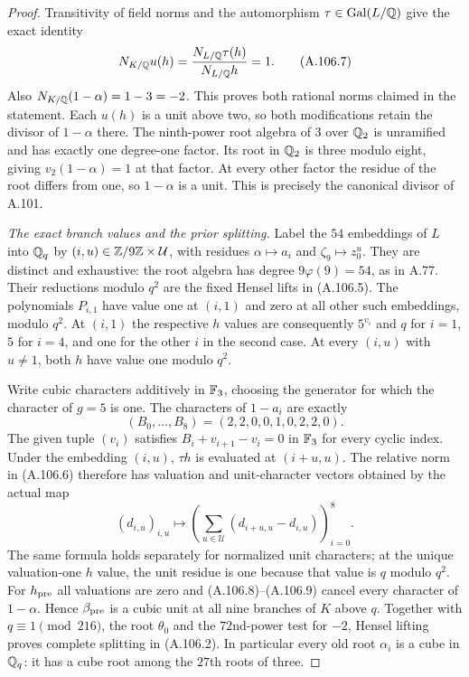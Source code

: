 \begin{proof}
Transitivity of field norms and the automorphism
$\tau\in\operatorname{Gal}(L/\mathbb Q)$ give the exact identity
\[
 N_{K/\mathbb Q}u(h)
      =\frac{N_{L/\mathbb Q}\tau(h)}{N_{L/\mathbb Q}h}=1.
 \tag{A.106.7}
\]
Also $N_{K/\mathbb Q}(1-\alpha)=1-3=-2$.
This proves both rational norms claimed in the statement.
Each $u(h)$ is a unit above two, so both modifications
retain the divisor of $1-\alpha$ there.
The ninth-power root algebra of $3$ over $\mathbb Q_2$ is
unramified and has exactly one degree-one factor.
Its root in $\mathbb Q_2$ is three modulo eight, giving
$v_2(1-\alpha)=1$ at that factor.
At every other factor the residue of the root differs
from one, so $1-\alpha$ is a unit.
This is precisely the canonical divisor of A.101.

\emph{The exact branch values and the prior splitting.}
Label the $54$ embeddings of $L$ into $\mathbb Q_q$ by
$(i,u)\in\mathbb Z/9\mathbb Z\times\mathcal U$, with residues
$\alpha\mapsto a_i$ and $\zeta_9\mapsto z_0^u$.
They are distinct and exhaustive: the root algebra has
degree $9\varphi(9)=54$, as in A.77.
Their reductions modulo $q^2$ are the fixed Hensel
lifts in (A.106.5).
The polynomials $P_{i,1}$ have value one at $(i,1)$
and zero at all other such embeddings, modulo $q^2$.
At $(i,1)$ the respective $h$ values are consequently
$5^{v_i}$ and $q$ for $i=1$, $5$ for $i=4$, and one
for the other $i$ in the second case.
At every $(i,u)$ with $u\ne1$, both $h$ have value one
modulo $q^2$.

Write cubic characters additively in $\mathbb F_3$, choosing
the generator for which the character of $g=5$ is one.
The characters of $1-a_i$ are exactly
\[
       (B_0,\ldots,B_8)=(2,2,0,0,1,0,2,2,0).
 \tag{A.106.8}
\]
The given tuple $(v_i)$ satisfies
$B_i+v_{i+1}-v_i=0$ in $\mathbb F_3$ for every cyclic index.
Under the embedding $(i,u)$, $\tau h$ is evaluated
at $(i+u,u)$.
The relative norm in (A.106.6) therefore has valuation
and unit-character vectors obtained by the actual map
\[
 (d_{i,u})_{i,u}\longmapsto
          \left(\sum_{u\in\mathcal U}
                      (d_{i+u,u}-d_{i,u})\right)_{i=0}^8.
 \tag{A.106.9}
\]
The same formula holds separately for normalized unit
characters; at the unique valuation-one $h$ value,
the unit residue is one because that value is $q$
modulo $q^2$.
For $h_{\rm pre}$ all valuations are zero and
(A.106.8)--(A.106.9) cancel every character of
$1-\alpha$.
Hence $\beta_{\rm pre}$ is a cubic unit at all nine
branches of $K$ above $q$.
Together with $q\equiv1\pmod{216}$, the root
$\theta_0$ and the $72$nd-power test for $-2$,
Hensel lifting proves complete splitting in (A.106.2).
In particular every old root $\alpha_i$ is a cube
in $\mathbb Q_q$: it has a cube root among the $27$th roots
of three.


\end{proof}
